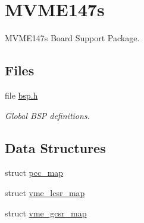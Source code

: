 \hypertarget{group__RTEMSBSPsM68kMVME147s}{}\section{M\+V\+M\+E147s}
\label{group__RTEMSBSPsM68kMVME147s}


M\+V\+M\+E147s Board Support Package.  


\subsection*{Files}
\begin{DoxyCompactItemize}
\item 
file \mbox{\hyperlink{bsps_2m68k_2mvme147s_2include_2bsp_8h}{bsp.\+h}}
\begin{DoxyCompactList}\small\item\em Global B\+SP definitions. \end{DoxyCompactList}\end{DoxyCompactItemize}
\subsection*{Data Structures}
\begin{DoxyCompactItemize}
\item 
struct \mbox{\hyperlink{structpcc__map}{pcc\+\_\+map}}
\item 
struct \mbox{\hyperlink{structvme__lcsr__map}{vme\+\_\+lcsr\+\_\+map}}
\item 
struct \mbox{\hyperlink{structvme__gcsr__map}{vme\+\_\+gcsr\+\_\+map}}
\end{DoxyCompactItemize}
